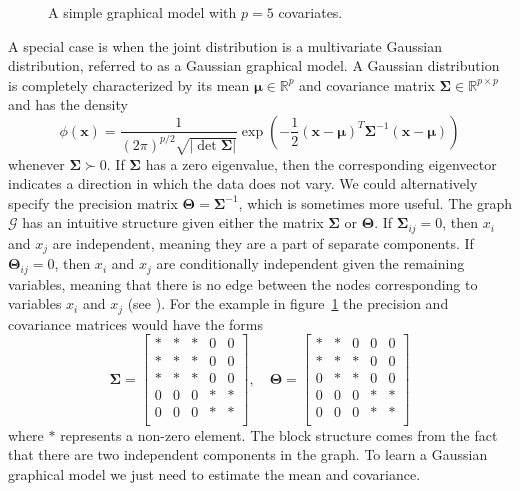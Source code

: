 \documentclass[10pt, letterpaper]{article}
\newcommand{\bx}{\boldsymbol x} %
\newcommand{\R}{\mathbb{R}} %
\newcommand{\cov}{\boldsymbol \Sigma}
\newcommand{\preci}{\boldsymbol \Theta}
\newcommand{\mean}{\boldsymbol \mu}
\begin{document}
\begin{figure}
\centering
{}
\caption{A simple graphical model with $p=5$ covariates.}
\label{fig:graphical_model}
\end{figure}



A special case is when the joint distribution is a multivariate Gaussian distribution, referred to as a Gaussian graphical model.  A Gaussian distribution is completely characterized by its mean $\mean \in \R^p$ and covariance matrix $\cov \in \R^{p\times p}$ and has the density
\begin{equation}
\phi(\bx) = \frac{1}{(2\pi)^{p/2} \sqrt{ |\det \cov| } } \exp \left( -\frac{1}{2}(\bx - \mean)^T \cov^{-1} (\bx - \mean)  \right)
\label{eq:gauss_density}
\end{equation}
whenever $\cov \succ 0$.  If $\cov$ has a zero eigenvalue, then the corresponding eigenvector indicates a direction in which the data does not vary.  We could alternatively specify the precision matrix $\preci = \cov^{-1}$, which is sometimes more useful.  The graph $\mathcal{G}$ has an intuitive structure given either the matrix $\cov$ or $\preci$.  If $\cov_{ij} = 0$, then $x_i$ and $x_j$ are independent, meaning they are a part of separate components.   If $\preci_{ij} = 0$, then $x_i$ and $x_j$ are conditionally independent given the remaining variables, meaning that there is no edge between the nodes corresponding to variables $x_i$ and $x_j$ (see \cite{GLASSO}).  For the example in figure~\ref{fig:graphical_model} the precision and covariance matrices would have the forms
\[
\cov = \begin{bmatrix}
* & * & * & 0 & 0\\
* & * & * & 0 & 0\\
* & * & * & 0 & 0\\
0 & 0 & 0 & * & *\\
0 & 0 & 0 & * & *\\
\end{bmatrix}, \quad 
\preci = \begin{bmatrix}
* & * & 0 & 0 & 0\\
* & * & * & 0 & 0\\
0 & * & * & 0 & 0\\
0 & 0 & 0 & * & *\\
0 & 0 & 0 & * & *\\
\end{bmatrix}
\]
where $*$ represents a non-zero element.  The block structure comes from the fact that there are two independent components in the graph.  To learn a Gaussian graphical model we just need to estimate the mean and covariance.
\end{document}
